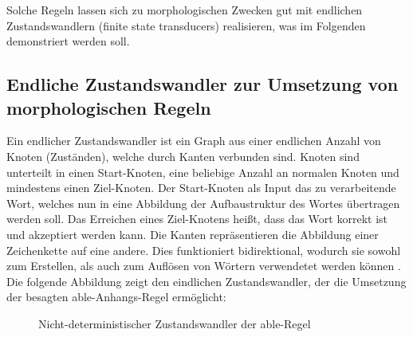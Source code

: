\documentclass[12pt]{report}
\begin{document}
Solche Regeln lassen sich zu morphologischen Zwecken gut mit endlichen Zustandswandlern (finite state transducers) realisieren, was im Folgenden demonstriert werden soll.

\subsection{Endliche Zustandswandler zur Umsetzung von morphologischen Regeln}
Ein endlicher Zustandswandler ist ein Graph aus einer endlichen Anzahl von Knoten (Zuständen), welche durch Kanten verbunden sind. Knoten sind unterteilt in einen Start-Knoten, eine beliebige Anzahl an normalen Knoten und mindestens einen Ziel-Knoten. Der Start-Knoten als Input das zu verarbeitende Wort, welches nun in eine Abbildung der Aufbaustruktur des Wortes übertragen werden soll. Das Erreichen eines Ziel-Knotens heißt, dass das Wort korrekt ist und akzeptiert werden kann. Die Kanten repräsentieren die Abbildung einer Zeichenkette auf eine andere. Dies funktioniert bidirektional, wodurch sie sowohl zum Erstellen, als auch zum Auflösen von Wörtern verwendetet werden können \cite{cop04}. Die folgende Abbildung zeigt den eindlichen Zustandswandler, der die Umsetzung der besagten \glqq  able\grqq{}-Anhangs-Regel ermöglicht:
\\

\begin{figure}
\begin{center}
\caption{Nicht-deterministischer Zustandswandler der able-Regel}
\end{center}
\end{figure}
\end{document}
